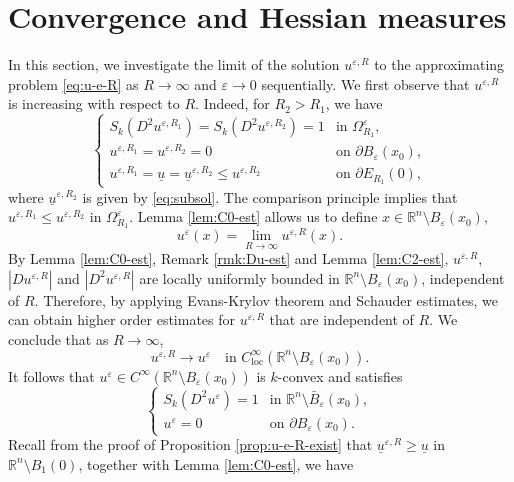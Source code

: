 \documentclass[reqno]{amsart}
\theoremstyle{remark}
\theoremstyle{definition}
\numberwithin{equation}{section}
\begin{document}
\section{Convergence and Hessian measures}\label{sec:u-e}
In this section, we investigate the limit of the solution $u^{\varepsilon,R}$ to the approximating problem \eqref{eq:u-e-R} as $R\to\infty$ and $\varepsilon\to0$ sequentially.
We first observe that $u^{\varepsilon,R}$ is increasing with respect to $R$. Indeed, for $R_2>R_1$, we have
\begin{equation*}
	\begin{cases}
		S_k(D^2u^{\varepsilon,R_1})=S_k(D^2u^{\varepsilon,R_2})=1 & \text{in }\Omega_{R_1}^\varepsilon, \\
		u^{\varepsilon,R_1}=u^{\varepsilon,R_2}=0 & \text{on }\partial B_\varepsilon(x_0), \\
		u^{\varepsilon,R_1}=\underline{u}=\underline{u}^{\varepsilon,R_2}\leq u^{\varepsilon,R_2} & \text{on }\partial E_{R_1}(0),
		\end{cases}
\end{equation*}
where $\underline{u}^{\varepsilon,R_2}$ is given by \eqref{eq:subsol}. The comparison principle implies that $u^{\varepsilon,R_1}\leq u^{\varepsilon,R_2}$ in $\Omega^\varepsilon_{R_1}$. Lemma \ref{lem:C0-est} allows   us to define $x\in\mathbb{R}^n\setminus B_\varepsilon(x_0)$, 
$$u^\varepsilon(x)=\lim_{R\to\infty}u^{\varepsilon,R}(x).$$ 
By Lemma \ref{lem:C0-est}, Remark \ref{rmk:Du-est} and Lemma \ref{lem:C2-est}, $u^{\varepsilon,R}$, $|Du^{\varepsilon,R}|$ and $|D^2u^{\varepsilon,R}|$ are locally uniformly bounded in $\mathbb{R}^n\setminus B_\varepsilon(x_0)$, independent of $R$. Therefore, by applying Evans-Krylov theorem and Schauder estimates, we can obtain higher order estimates for $u^{\varepsilon,R}$ that are independent of $R$. We conclude that as $R\to\infty$,
\[u^{\varepsilon,R}\to u^\varepsilon\quad\text{in }C_{\mathrm{loc}}^\infty(\mathbb{R}^n\setminus B_\varepsilon(x_0)).\] 
It follows that $u^\varepsilon\in C^\infty(\mathbb{R}^n\setminus B_\varepsilon(x_0))$ is $k$-convex and satisfies
\[
\begin{cases}
	S_k(D^2u^\varepsilon)=1 & \text{in }\mathbb{R}^n\setminus\bar{B}_\varepsilon(x_0), \\
	u^\varepsilon=0 & \text{on }\partial B_\varepsilon(x_0).
\end{cases}
\]
Recall from the proof of Proposition \ref{prop:u-e-R-exist} that $\underline{u}^{\varepsilon,R}\geq\underline{u}$ in $\mathbb{R}^n\setminus B_1(0)$, together with Lemma \ref{lem:C0-est}, we have
\end{document}
